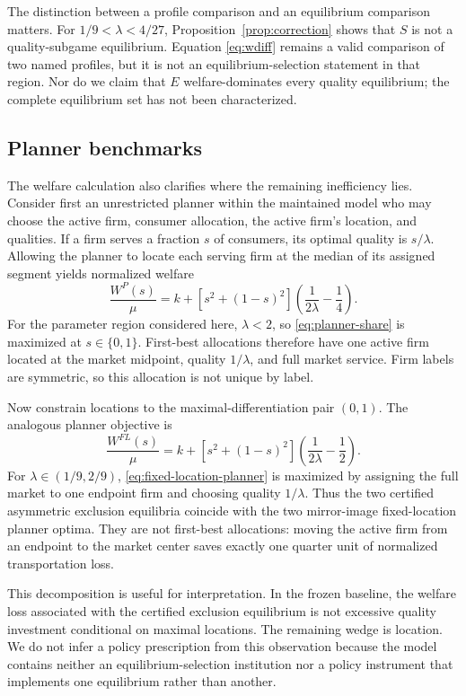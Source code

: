 The distinction between a profile comparison and an equilibrium comparison matters. For $1/9<\lambda<4/27$, Proposition~\ref{prop:correction} shows that $S$ is not a quality-subgame equilibrium. Equation \eqref{eq:wdiff} remains a valid comparison of two named profiles, but it is not an equilibrium-selection statement in that region. Nor do we claim that $E$ welfare-dominates every quality equilibrium; the complete equilibrium set has not been characterized.

\subsection{Planner benchmarks}\label{subsec:planner}

The welfare calculation also clarifies where the remaining inefficiency lies. Consider first an unrestricted planner within the maintained model who may choose the active firm, consumer allocation, the active firm's location, and qualities. If a firm serves a fraction $s$ of consumers, its optimal quality is $s/\lambda$. Allowing the planner to locate each serving firm at the median of its assigned segment yields normalized welfare
\begin{equation}\label{eq:planner-share}
 \frac{W^{P}(s)}{\mu}
 =k+\left[s^2+(1-s)^2\right]\left(\frac1{2\lambda}-\frac14\right).
\end{equation}
For the parameter region considered here, $\lambda<2$, so \eqref{eq:planner-share} is maximized at $s\in\{0,1\}$. First-best allocations therefore have one active firm located at the market midpoint, quality $1/\lambda$, and full market service. Firm labels are symmetric, so this allocation is not unique by label.

Now constrain locations to the maximal-differentiation pair $(0,1)$. The analogous planner objective is
\begin{equation}\label{eq:fixed-location-planner}
 \frac{W^{FL}(s)}{\mu}
 =k+\left[s^2+(1-s)^2\right]\left(\frac1{2\lambda}-\frac12\right).
\end{equation}
For $\lambda\in(1/9,2/9)$, \eqref{eq:fixed-location-planner} is maximized by assigning the full market to one endpoint firm and choosing quality $1/\lambda$. Thus the two certified asymmetric exclusion equilibria coincide with the two mirror-image fixed-location planner optima. They are not first-best allocations: moving the active firm from an endpoint to the market center saves exactly one quarter unit of normalized transportation loss.

This decomposition is useful for interpretation. In the frozen baseline, the welfare loss associated with the certified exclusion equilibrium is not excessive quality investment conditional on maximal locations. The remaining wedge is location. We do not infer a policy prescription from this observation because the model contains neither an equilibrium-selection institution nor a policy instrument that implements one equilibrium rather than another.

\begin{table}[t]
\centering
\caption{Parameter-region summary at maximal locations}
\label{tab:regions}

\end{table}
